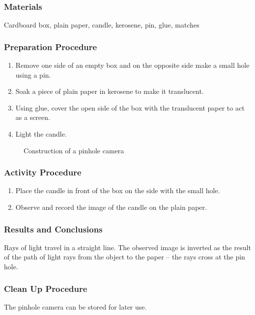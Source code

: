 \subsubsection*{Materials}
Cardboard box, plain paper, candle, kerosene, pin, glue, matches


\subsubsection*{Preparation Procedure}
\begin{enumerate}
\item{Remove one side of an empty box and on the opposite side make a small hole using a pin.} 
\item{Soak a piece of plain paper in kerosene to make it translucent.} 
\item{Using glue, cover the open side of the box with the translucent paper to act as a screen.} 
\item{Light the candle.} 
\end{enumerate}

\begin{figure}
\begin{center}
\def\svgwidth{250pt}

\caption{Construction of a pinhole camera}
\label{fig:pinhole-camera}
\end{center}
\end{figure}

\subsubsection*{Activity Procedure}
\begin{enumerate}
\item{Place the candle in front of the box on the side with the small hole.} 
\item{Observe and record the image of the candle on the plain paper.} 
\end{enumerate}

\subsubsection*{Results and Conclusions}
Rays of light travel in a straight line. The observed image is inverted as the result of the path of light rays from the object to the paper -- the rays cross at the pin hole.

\subsubsection*{Clean Up Procedure}
The pinhole camera can be stored for later use.

